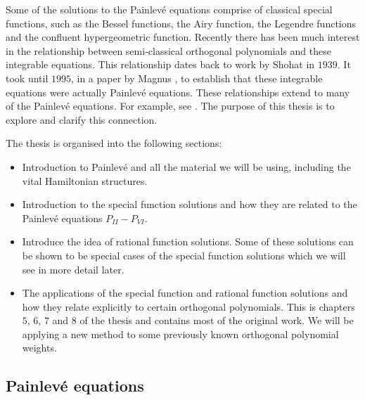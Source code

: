 \documentclass[12pt]{article}
\def\P{Painlev\'e }
\numberwithin{figure}{section}
\numberwithin{equation}{section}
\numberwithin{table}{section}
\begin{document}
Some of the solutions to the \P equations comprise of classical special functions, such as the Bessel functions, the Airy function, the Legendre functions and the confluent hypergeometric function. Recently \cite{P:PAC&KJ} there has been much interest in the relationship between semi-classical orthogonal polynomials and these integrable
equations. This relationship dates back to work by Shohat \cite{P:325:2251} in $1939$. It took until $1995$, in a paper by Magnus \cite{P:57:37}, to establish
that these integrable equations were actually \P equations. These relationships extend to many of the \P equations. For example, see
\cite{P:42:320,Basor,P:44:035202,Chen,Rec,P:PAC&KJ,P:45:205201,Ormerod,2004:159,Bornemann}. The purpose of this thesis is to explore and clarify this connection.

The thesis is organised into the following sections:
\begin{itemize}
\item Introduction to \P and all the material we will be using, including the vital Hamiltonian structures.
\item Introduction to the special function solutions and how they are related to the \P equations $P_{II} - P_{VI}$.
\item Introduce the idea of rational function solutions. Some of these solutions can be shown to be special cases of the special function solutions which we will see in more detail later.
\item The applications of the special function and rational function solutions and how they relate explicitly to certain orthogonal polynomials. This is chapters $5$, $6$, $7$ and $8$ of the thesis and contains most of the original work. We will be applying a new method to some previously known orthogonal polynomial weights.
\end{itemize}
\subsection{\P equations}
\end{document}
